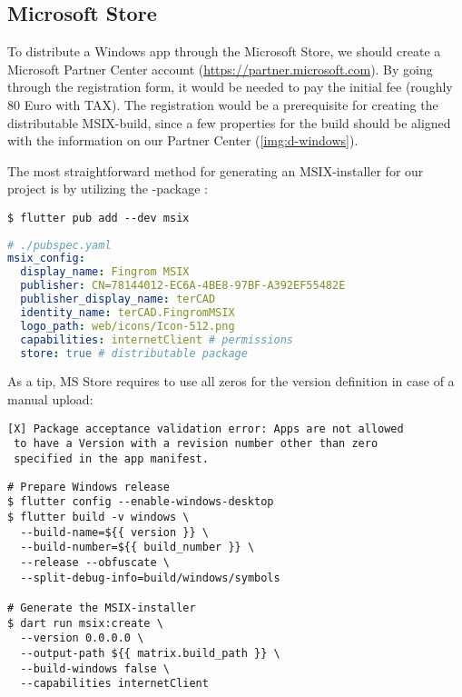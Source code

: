 
\subsection{Microsoft Store}

To distribute a Windows app through the Microsoft Store, we should create a Microsoft Partner Center account
(\href{https://partner.microsoft.com}{https://partner.microsoft.com}). By going through the registration form, it 
would be needed to pay the initial fee (roughly 80 Euro with TAX). The registration would be a prerequisite for 
creating the distributable MSIX-build, since a few properties for the build should be aligned with the information on 
our Partner Center (\cref{img:d-windows}). 

The most straightforward method for generating an MSIX-installer for our project is by utilizing the 
-package :

\begin{lstlisting}[language=terminal]
$ flutter pub add --dev msix
\end{lstlisting}

\begin{lstlisting}[language=yaml]
# ./pubspec.yaml
msix_config:
  display_name: Fingrom MSIX
  publisher: CN=78144012-EC6A-4BE8-97BF-A392EF55482E
  publisher_display_name: terCAD
  identity_name: terCAD.FingromMSIX
  logo_path: web/icons/Icon-512.png
  capabilities: internetClient # permissions
  store: true # distributable package
\end{lstlisting}


\noindent As a tip, MS Store requires to use all zeros for the version definition in case of a manual upload:

\begin{lstlisting}[language=terminal]
[X] Package acceptance validation error: Apps are not allowed
 to have a Version with a revision number other than zero 
 specified in the app manifest.
\end{lstlisting}

\begin{lstlisting}[language=terminal]
# Prepare Windows release
$ flutter config --enable-windows-desktop
$ flutter build -v windows \
  --build-name=${{ version }} \
  --build-number=${{ build_number }} \
  --release --obfuscate \
  --split-debug-info=build/windows/symbols

# Generate the MSIX-installer
$ dart run msix:create \
  --version 0.0.0.0	\
  --output-path ${{ matrix.build_path }} \
  --build-windows false \
  --capabilities internetClient
\end{lstlisting}

